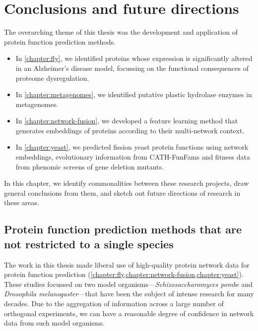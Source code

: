 
\chapter{Conclusions and future directions}
\label{chapter:discussion}

The overarching theme of this thesis was the development and application of protein function prediction methods.
\begin{itemize}
    \item In \ref{chapter:fly}, we identified proteins whose expression is significantly altered in an Alzheimer's disease model, focussing on the functional consequences of proteome dysregulation.
    \item In \ref{chapter:metagenomes}, we identified putative plastic hydrolase enzymes in metagenomes.
    \item In \ref{chapter:network-fusion}, we developed a feature learning method that generates embeddings of proteins according to their multi-network context.
    \item In \ref{chapter:yeast}, we predicted fission yeast protein functions using network embeddings, evolutionary information from CATH-FunFams and fitness data from phenomic screens of gene deletion mutants.
\end{itemize}
In this chapter, we identify commonalities between these research projects, draw general conclusions from them, and sketch out future directions of research in these areas.

\section{Protein function prediction methods that are not restricted to a single species}

The work in this thesis made liberal use of high-quality protein network data for protein function prediction (\ref{chapter:fly,chapter:network-fusion,chapter:yeast}). These studies focussed on two model organisms---\emph{Schizosaccharomyces pombe} and \emph{Drosophila melanogaster}---that have been the subject of intense research for many decades. Due to the aggregation of information across a large number of orthogonal experiments, we can have a reasonable degree of confidence in network data from such model organisms.

